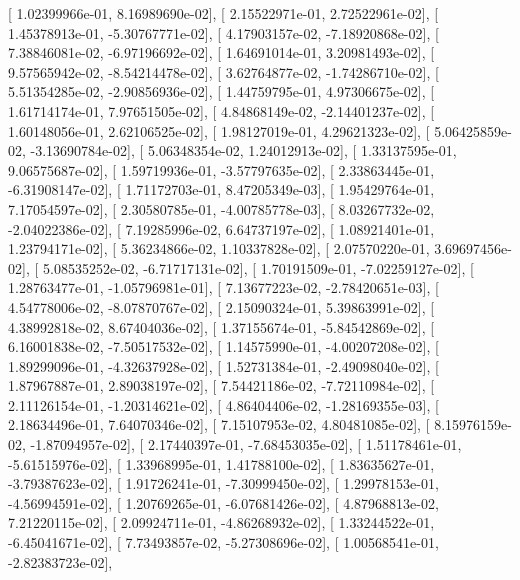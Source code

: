 \documentclass{article}
\begin{document}
       [  1.02399966e-01,   8.16989690e-02],
       [  2.15522971e-01,   2.72522961e-02],
       [  1.45378913e-01,  -5.30767771e-02],
       [  4.17903157e-02,  -7.18920868e-02],
       [  7.38846081e-02,  -6.97196692e-02],
       [  1.64691014e-01,   3.20981493e-02],
       [  9.57565942e-02,  -8.54214478e-02],
       [  3.62764877e-02,  -1.74286710e-02],
       [  5.51354285e-02,  -2.90856936e-02],
       [  1.44759795e-01,   4.97306675e-02],
       [  1.61714174e-01,   7.97651505e-02],
       [  4.84868149e-02,  -2.14401237e-02],
       [  1.60148056e-01,   2.62106525e-02],
       [  1.98127019e-01,   4.29621323e-02],
       [  5.06425859e-02,  -3.13690784e-02],
       [  5.06348354e-02,   1.24012913e-02],
       [  1.33137595e-01,   9.06575687e-02],
       [  1.59719936e-01,  -3.57797635e-02],
       [  2.33863445e-01,  -6.31908147e-02],
       [  1.71172703e-01,   8.47205349e-03],
       [  1.95429764e-01,   7.17054597e-02],
       [  2.30580785e-01,  -4.00785778e-03],
       [  8.03267732e-02,  -2.04022386e-02],
       [  7.19285996e-02,   6.64737197e-02],
       [  1.08921401e-01,   1.23794171e-02],
       [  5.36234866e-02,   1.10337828e-02],
       [  2.07570220e-01,   3.69697456e-02],
       [  5.08535252e-02,  -6.71717131e-02],
       [  1.70191509e-01,  -7.02259127e-02],
       [  1.28763477e-01,  -1.05796981e-01],
       [  7.13677223e-02,  -2.78420651e-03],
       [  4.54778006e-02,  -8.07870767e-02],
       [  2.15090324e-01,   5.39863991e-02],
       [  4.38992818e-02,   8.67404036e-02],
       [  1.37155674e-01,  -5.84542869e-02],
       [  6.16001838e-02,  -7.50517532e-02],
       [  1.14575990e-01,  -4.00207208e-02],
       [  1.89299096e-01,  -4.32637928e-02],
       [  1.52731384e-01,  -2.49098040e-02],
       [  1.87967887e-01,   2.89038197e-02],
       [  7.54421186e-02,  -7.72110984e-02],
       [  2.11126154e-01,  -1.20314621e-02],
       [  4.86404406e-02,  -1.28169355e-03],
       [  2.18634496e-01,   7.64070346e-02],
       [  7.15107953e-02,   4.80481085e-02],
       [  8.15976159e-02,  -1.87094957e-02],
       [  2.17440397e-01,  -7.68453035e-02],
       [  1.51178461e-01,  -5.61515976e-02],
       [  1.33968995e-01,   1.41788100e-02],
       [  1.83635627e-01,  -3.79387623e-02],
       [  1.91726241e-01,  -7.30999450e-02],
       [  1.29978153e-01,  -4.56994591e-02],
       [  1.20769265e-01,  -6.07681426e-02],
       [  4.87968813e-02,   7.21220115e-02],
       [  2.09924711e-01,  -4.86268932e-02],
       [  1.33244522e-01,  -6.45041671e-02],
       [  7.73493857e-02,  -5.27308696e-02],
       [  1.00568541e-01,  -2.82383723e-02],
\end{document}
